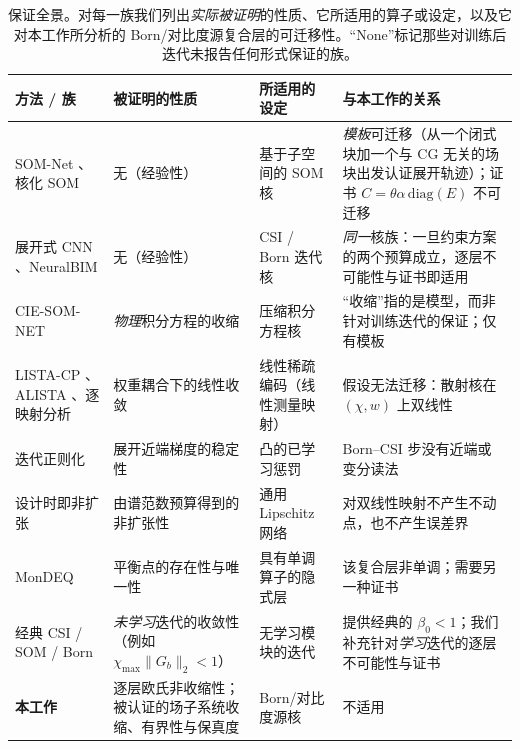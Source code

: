 \documentclass[UTF8,a4paper,11pt]{ctexart}
\newcommand{\norm}[1]{\lVert #1 \rVert}
\begin{document}
\begin{table}[htbp]
\centering
\caption{保证全景。对每一族我们列出\emph{实际被证明}的性质、它所适用的算子或设定，以及它对本工作所分析的 Born/对比度源复合层的可迁移性。“None”标记那些对训练后迭代未报告任何形式保证的族。}
\label{tab:guarantees}
\small\setlength{\emergencystretch}{1.5em}\hfuzz=0.75pt
\renewcommand{\arraystretch}{1.2}
\begin{tabular}{@{}p{}p{}p{}p{}@{}}
\toprule
方法 / 族 & 被证明的性质 & 所适用的设定 & 与本工作的关系 \\
\midrule
SOM-Net \cite{somnet}、核化 SOM \cite{kernelunroll} & 无（经验性） &
基于子空间的 SOM 核 & \emph{模板}可迁移（从一个闭式块加一个与 CG 无关的场块出发认证展开轨迹）；证书
$C=\theta\alpha\,\mathrm{diag}(E)$ 不可迁移 \\
展开式 CNN \cite{unrolledcnn}、NeuralBIM \cite{neuralbim,mfneuralbim} & 无（经验性） &
CSI / Born 迭代核 & \emph{同一}核族：一旦约束方案的两个预算成立，逐层不可能性与证书即适用 \\
CIE-SOM-NET \cite{ciesomnet} & \emph{物理}积分方程的收缩 &
压缩积分方程核 & “收缩”指的是模型，而非针对训练迭代的保证；仅有模板 \\
LISTA-CP \cite{listacp}、ALISTA \cite{alista}、逐映射分析 \cite{algomapping} &
权重耦合下的线性收敛 & 线性稀疏编码（线性测量映射） &
假设无法迁移：散射核在 $(\chi,w)$ 上双线性 \\
迭代正则化 \cite{cui_reg} & 展开近端梯度的稳定性 &
凸的已学习惩罚 & Born--CSI 步没有近端或变分读法 \\
设计时即非扩张 \cite{sherry_nonexp} & 由谱范数预算得到的非扩张性 &
通用 Lipschitz 网络 & 对双线性映射不产生不动点，也不产生误差界 \\
MonDEQ \cite{mondeq} & 平衡点的存在性与唯一性 & 具有单调算子的隐式层 &
该复合层非单调；需要另一种证书 \\
经典 CSI / SOM / Born \cite{csi_lit,som_lit,born_lit,convergentborn} &
\emph{未学习}迭代的收敛性（例如 $\chi_{\max}\norm{G_b}_2<1$） &
无学习模块的迭代 & 提供经典的 $\beta_0<1$；我们补充针对\emph{学习}迭代的逐层不可能性与证书 \\
\textbf{本工作} & 逐层欧氏非收缩性；被认证的场子系统收缩、有界性与保真度 & Born/对比度源核 & 不适用 \\
\bottomrule
\end{tabular}
\end{table}
\end{document}
